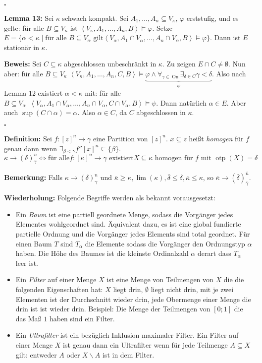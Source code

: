 \documentclass[a4paper,fontsize=11pt]{scrartcl}
\newcommand{\On}{\operatorname{On}}
\newcommand{\otp}{\operatorname{otp}}
\begin{document}
\hfill $\square$

{\bf Lemma 13:} Sei $\kappa$ schwach kompakt. Sei
$A_1,\ldots,A_n\subseteq V_\kappa$, $\varphi$ erststufig, und es
gelte: für alle $B\subseteq V_\kappa$ ist
$\left<V_\kappa,A_1,\ldots,A_n,B\right>\models\varphi$. Setze
$E=\{\alpha<\kappa\mid\mbox{für alle }B\subseteq V_\alpha\mbox{ gilt
}\left<V_\alpha,A_1\cap V_\alpha,\ldots,A_n\cap V_\alpha,
B\right>\models\varphi\}$. Dann ist $E$ stationär in $\kappa$.

{\bf Beweis:} Sei $C\subseteq\kappa$ abgeschlossen unbeschränkt in
$\kappa$. Zu zeigen $E\cap C\neq\emptyset$. Nun aber: für alle
$B\subseteq V_\kappa$
$\left<V_\kappa,A_1,\ldots,A_n,C,B\right>\models\underbrace{\varphi\wedge\forall_{\gamma\in\On}\exists_{\delta\in
    C}\gamma<\delta}_\psi$. Also nach Lemma 12 existiert
$\alpha<\kappa$ mit: für alle $B\subseteq
V_\alpha\phantom{a}\left<V_\alpha,A_1\cap V_\alpha,\ldots,A_n\cap
V_\alpha,C\cap V_\alpha, B\right>\models\psi$. Dann natürlich
$\alpha\in E$. Aber auch $\sup(C\cap\alpha)=\alpha$. Also $\alpha\in
C$, da $C$ abgeschlossen in $\kappa$.

\hfill $\square$

{\bf Definition:} Sei $f:[z]^n\rightarrow\gamma$ eine Partition von
$[z]^n$. $x\subseteq z$ heißt {\it homogen} für $f$ genau dann wenn
$\exists_{\beta<\gamma} f''[x]^n\subseteq\{\beta\}$.
$$ \kappa \rightarrow (\delta)_\gamma^n \Leftrightarrow \mbox{für alle
} f:[\kappa]^n\rightarrow\gamma\mbox{ existiert
}X\subseteq\kappa\mbox{ homogen für }f\mbox{ mit }\otp(X)=\delta $$

{\bf Bemerkung:} Falls $\kappa\rightarrow(\delta)_\gamma^n$ und
$\overline{\kappa}\ge\kappa,\lim(\kappa),\overline{\delta}\le\delta,\overline{\kappa}\le\kappa$,
so
$\overline{\kappa}\rightarrow(\overline{\delta})_{\overline{\gamma}}^{\overline{n}}$.

{\bf Wiederholung:}
Folgende Begriffe werden als bekannt vorausgesetzt:
\begin{itemize}
\item Ein {\it Baum} ist eine partiell geordnete Menge, sodass die
  Vorgänger jedes Elementes wohlgeordnet sind. Äquivalent dazu, es ist
  eine global fundierte partielle Ordnung und die Vorgänger jedes
  Elements sind total geordnet. Für einen Baum $T$ sind $T_\alpha$ die
  Elemente sodass die Vorgänger den Ordnungstyp $\alpha$ haben. Die
  Höhe des Baumes ist die kleinste Ordinalzahl $\alpha$ derart dass
  $T_\alpha$ leer ist.
\item Ein {\it Filter} auf einer Menge $X$ ist eine Menge von
  Teilmengen von $X$ die die folgenden Eigenschaften hat: $X$ liegt
  drin, $\emptyset$ liegt nicht drin, mit je zwei Elementen ist der
  Durchschnitt wieder drin, jede Obermenge einer Menge die drin ist
  ist wieder drin. Beispiel: Die Menge der Teilmengen von $[0;1]$ die
  das Maß $1$ haben sind ein Filter.
\item Ein {\it Ultrafilter} ist ein bezüglich Inklusion maximaler
  Filter. Ein Filter auf einer Menge $X$ ist genau dann ein
  Ultrafilter wenn für jede Teilmenge $A\subseteq X$ gilt: entweder
  $A$ oder $X\backslash A$ ist in dem Filter.
\end{itemize}
\end{document}

